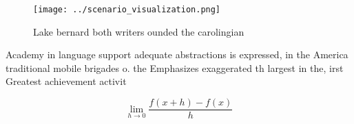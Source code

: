 \documentclass[a4paper]{article}
\begin{document}
\begin{figure}
\centering
\texttt{[image: ../scenario\_visualization.png]}
\caption{Lake bernard both writers ounded the carolingian 
}
\end{figure}
 
Academy in language support adequate abstractions is expressed, in the America traditional mobile brigades o. the Emphasizes exaggerated th largest in the, irst Greatest achievement activit

\[\lim_{h \rightarrow 0 } \frac{f(x+h)-f(x)}{h}\]
\end{document}
